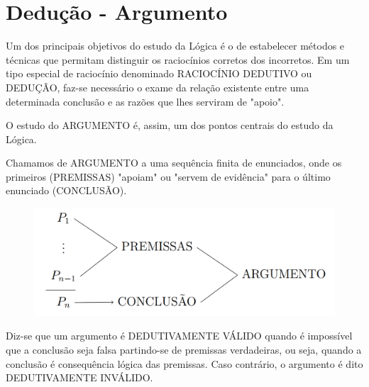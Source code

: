 \chapter{Dedução - Argumento}

Um dos principais objetivos do estudo da Lógica é o de estabelecer métodos e técnicas que permitam distinguir os raciocínios corretos dos incorretos.
Em um tipo especial de raciocínio denominado RACIOCÍNIO DEDUTIVO ou DEDUÇÃO, faz-se necessário o exame da relação existente entre uma determinada conclusão e as razões que lhes serviram de "apoio".

O estudo do ARGUMENTO é, assim, um dos pontos centrais do estudo da Lógica.

Chamamos de ARGUMENTO a uma sequência finita de enunciados, onde os primeiros (PREMISSAS) "apoiam" ou "servem de evidência" para o último enunciado (CONCLUSÃO).

\begin{figure}[H]
	\begin{center}
	    \includegraphics[scale=0.3]{diagramaCapitulo5Grande.png}
	\end{center}
\end{figure}

Diz-se que um argumento é DEDUTIVAMENTE VÁLIDO quando é impossível que a conclusão seja falsa partindo-se de premissas verdadeiras, ou seja, quando a conclusão é consequência lógica das premissas. Caso contrário, o argumento é dito DEDUTIVAMENTE INVÁLIDO.

